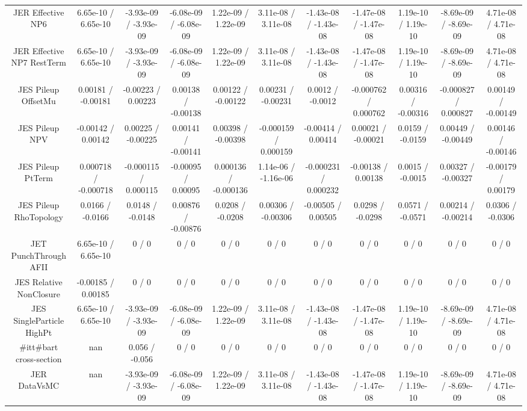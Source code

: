 \begin{table}[htbp]
\begin{center}
\begin{tabular}{|c|c|c|c|c|c|c|c|c|c|c|}
  JER Effective NP6 & 6.65e-10 / 6.65e-10 & -3.93e-09 / -3.93e-09 & -6.08e-09 / -6.08e-09 & 1.22e-09 / 1.22e-09 & 3.11e-08 / 3.11e-08 & -1.43e-08 / -1.43e-08 & -1.47e-08 / -1.47e-08 & 1.19e-10 / 1.19e-10 & -8.69e-09 / -8.69e-09 & 4.71e-08 / 4.71e-08 \\ 
  JER Effective NP7 RestTerm & 6.65e-10 / 6.65e-10 & -3.93e-09 / -3.93e-09 & -6.08e-09 / -6.08e-09 & 1.22e-09 / 1.22e-09 & 3.11e-08 / 3.11e-08 & -1.43e-08 / -1.43e-08 & -1.47e-08 / -1.47e-08 & 1.19e-10 / 1.19e-10 & -8.69e-09 / -8.69e-09 & 4.71e-08 / 4.71e-08 \\ 
  JES Pileup OffsetMu & 0.00181 / -0.00181 & -0.00223 / 0.00223 & 0.00138 / -0.00138 & 0.00122 / -0.00122 & 0.00231 / -0.00231 & 0.0012 / -0.0012 & -0.000762 / 0.000762 & 0.00316 / -0.00316 & -0.000827 / 0.000827 & 0.00149 / -0.00149 \\ 
  JES Pileup NPV & -0.00142 / 0.00142 & 0.00225 / -0.00225 & 0.00141 / -0.00141 & 0.00398 / -0.00398 & -0.000159 / 0.000159 & -0.00414 / 0.00414 & 0.00021 / -0.00021 & 0.0159 / -0.0159 & 0.00449 / -0.00449 & 0.00146 / -0.00146 \\ 
  JES Pileup PtTerm & 0.000718 / -0.000718 & -0.000115 / 0.000115 & -0.00095 / 0.00095 & 0.000136 / -0.000136 & 1.14e-06 / -1.16e-06 & -0.000231 / 0.000232 & -0.00138 / 0.00138 & 0.0015 / -0.0015 & 0.00327 / -0.00327 & -0.00179 / 0.00179 \\ 
  JES Pileup RhoTopology & 0.0166 / -0.0166 & 0.0148 / -0.0148 & 0.00876 / -0.00876 & 0.0208 / -0.0208 & 0.00306 / -0.00306 & -0.00505 / 0.00505 & 0.0298 / -0.0298 & 0.0571 / -0.0571 & 0.00214 / -0.00214 & 0.0306 / -0.0306 \\ 
  JET PunchThrough AFII & 6.65e-10 / 6.65e-10 & 0 / 0 & 0 / 0 & 0 / 0 & 0 / 0 & 0 / 0 & 0 / 0 & 0 / 0 & 0 / 0 & 0 / 0 \\ 
  JES Relative NonClosure & -0.00185 / 0.00185 & 0 / 0 & 0 / 0 & 0 / 0 & 0 / 0 & 0 / 0 & 0 / 0 & 0 / 0 & 0 / 0 & 0 / 0 \\ 
  JES SingleParticle HighPt & 6.65e-10 / 6.65e-10 & -3.93e-09 / -3.93e-09 & -6.08e-09 / -6.08e-09 & 1.22e-09 / 1.22e-09 & 3.11e-08 / 3.11e-08 & -1.43e-08 / -1.43e-08 & -1.47e-08 / -1.47e-08 & 1.19e-10 / 1.19e-10 & -8.69e-09 / -8.69e-09 & 4.71e-08 / 4.71e-08 \\ 
  #it{t#bar{t}} cross-section &    nan    & 0.056 / -0.056 & 0 / 0 & 0 / 0 & 0 / 0 & 0 / 0 & 0 / 0 & 0 / 0 & 0 / 0 & 0 / 0 \\ 
  JER DataVsMC &    nan    & -3.93e-09 / -3.93e-09 & -6.08e-09 / -6.08e-09 & 1.22e-09 / 1.22e-09 & 3.11e-08 / 3.11e-08 & -1.43e-08 / -1.43e-08 & -1.47e-08 / -1.47e-08 & 1.19e-10 / 1.19e-10 & -8.69e-09 / -8.69e-09 & 4.71e-08 / 4.71e-08 \\ 

\end{tabular}
\end{center}
\end{table}
